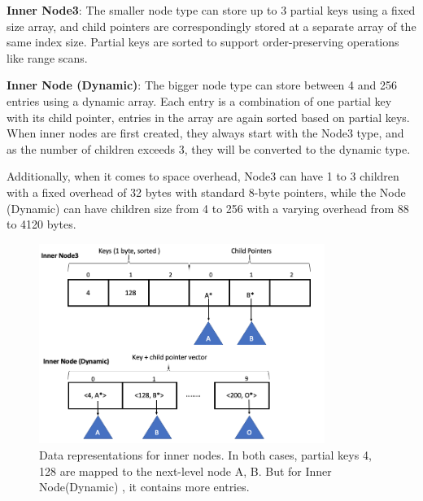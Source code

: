 \documentclass[sigplan,screen,nonacm]{acmart}
\begin{document}
\textbf {Inner Node3}: The smaller node type can store up to 3 partial keys using a fixed size array, and child pointers are correspondingly stored at a separate array of the same index size. Partial keys are sorted to support order-preserving operations like range scans.

\textbf {Inner Node (Dynamic)}: The bigger node type can store between 4 and 256 entries using a dynamic array. Each entry is a combination of one partial key with its child pointer, entries in the array are again sorted based on partial keys. When inner nodes are first created, they always start with the Node3 type, and as the number of children exceeds 3, they will be converted to the dynamic type.  

Additionally, when it comes to space overhead, Node3 can have 1 to 3 children with a fixed overhead of 32 bytes with standard 8-byte pointers, while the Node (Dynamic) can have children size from 4 to 256 with a varying overhead from 88 to 4120 bytes. 
\begin{figure}[t]
  \centering
  \includegraphics[width=\linewidth, height=6.5cm]{pic/inner nodes.png}
  \setlength{\belowcaptionskip}{-7pt} 
  \caption{Data representations for inner nodes. In both cases, partial keys 4, 128 are mapped to the next-level node A, B. But for Inner Node(Dynamic) , it contains more entries.}
  \label{fig:inner-nodes}
\end{figure}
\end{document}
